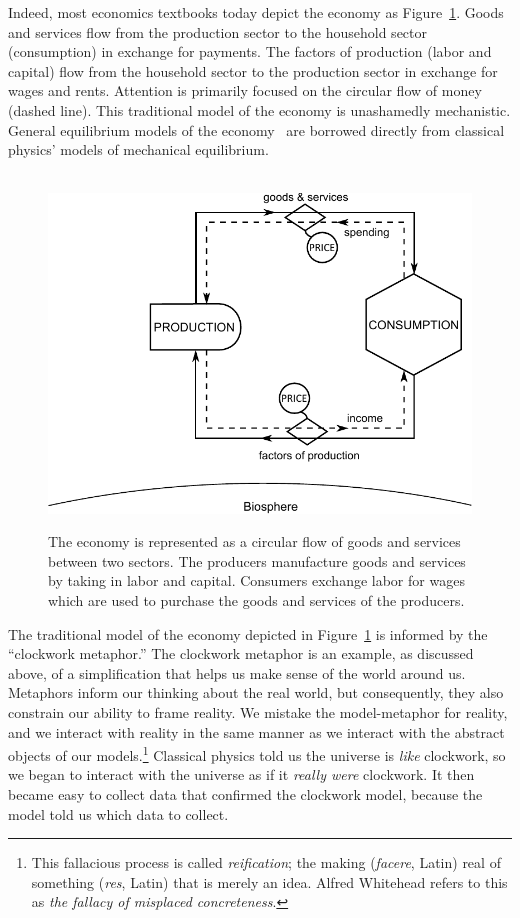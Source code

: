 Indeed, most economics textbooks today depict the economy 
as Figure~\ref{fig:perp_motion_1}.
Goods and services flow from the production sector
to the household sector (consumption)
in exchange for payments.
The factors of production (labor and capital)
flow from the household sector to the
production sector in exchange for wages and rents.
Attention is primarily focused on the circular flow
of money (dashed line).
This traditional model of the economy is unashamedly mechanistic.
General equilibrium models of the economy~\cite{Walras1892, Walras1993}
are borrowed directly from classical physics' models of 
mechanical equilibrium.\cite{Ingrao1990}

\begin{figure}[!ht]
\centering\
\includegraphics[width=\linewidth]{Part_0/Chapter_Introduction/images/Perpetual_motion_1.pdf}
\caption[The traditional economic model of the economy]{The economy 
is represented as a circular flow of goods and services between two sectors. 
The producers manufacture goods and services 
by taking in labor and capital. 
Consumers exchange labor for wages 
which are used to purchase 
the goods and services of the producers.}
\label{fig:perp_motion_1}
\end{figure}

The traditional model of the economy depicted in Figure~\ref{fig:perp_motion_1} 
is informed by the ``clockwork metaphor.''
The clockwork metaphor is an example, as discussed above, 
of a simplification that helps us make sense of the world around us.
Metaphors inform our thinking about the real world,
but consequently,
they also constrain our ability to frame reality.
We mistake the model-metaphor for reality, and
we interact with reality in the same manner 
as we interact with the abstract objects of our
models.\footnote{This fallacious process is called
	\emph{reification}; the making (\emph{facere}, Latin) real of
	something (\emph{res}, Latin) that is merely an idea.
	Alfred Whitehead refers to this as
	\emph{the fallacy of misplaced concreteness}.\cite{Whitehead2011}}
Classical physics told us the universe is
\emph{like} clockwork, 
so we began to interact with the universe
as if it \emph{really were} clockwork.
It then became easy to collect data that confirmed the clockwork model,
because the model told us which data to collect.

